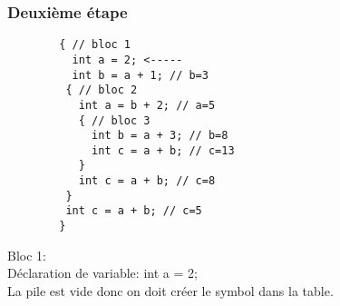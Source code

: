 \documentclass{../../res/univ-projet}
\begin{document}
    \subsubsection{Deuxième étape}
    \begin{multicols}{2}
        
        \begin{verbatim}
        { // bloc 1
          int a = 2; <-----
          int b = a + 1; // b=3
         { // bloc 2
           int a = b + 2; // a=5
           { // bloc 3
             int b = a + 3; // b=8
             int c = a + b; // c=13
           }
           int c = a + b; // c=8
         }
         int c = a + b; // c=5
        }

        \end{verbatim}

      \columnbreak
        Bloc 1:\\
        Déclaration de variable: int a = 2;\\
        La pile est vide donc on doit créer le symbol dans la table.
      \end{multicols}
\end{document}
